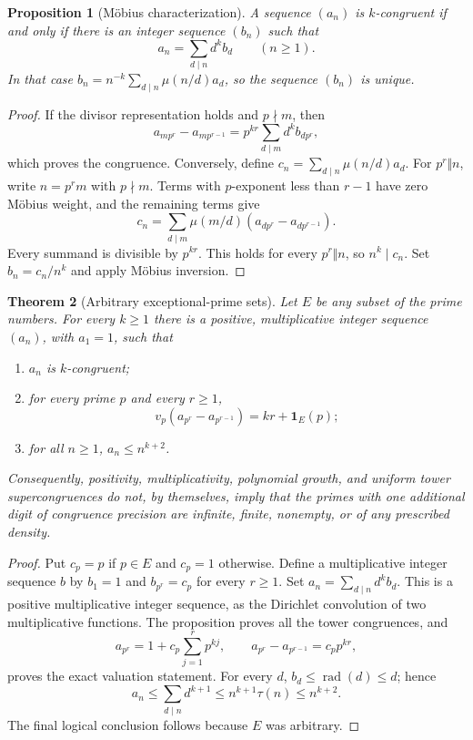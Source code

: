 \documentclass[11pt,a4paper]{article}
\newtheorem{theorem}{Theorem}[section]
\newtheorem{proposition}[theorem]{Proposition}
\theoremstyle{definition}
\theoremstyle{remark}
\begin{document}
\begin{proposition}[M\"obius characterization]
A sequence $(a_n)$ is $k$-congruent if and only if there is an integer
sequence $(b_n)$ such that
\[
 a_n=\sum_{d\mid n}d^k b_d\qquad(n\ge1).
\]
In that case $b_n=n^{-k}\sum_{d\mid n}\mu(n/d)a_d$, so the
sequence $(b_n)$ is unique.
\end{proposition}
\begin{proof}
If the divisor representation holds and $p\nmid m$, then
\[
 a_{mp^r}-a_{mp^{r-1}}
 =p^{kr}\sum_{d\mid m}d^k b_{dp^r},
\]
which proves the congruence. Conversely, define
$c_n=\sum_{d\mid n}\mu(n/d)a_d$. For $p^r\Vert n$, write
$n=p^r m$ with $p\nmid m$. Terms with $p$-exponent less than $r-1$
have zero M\"obius weight, and the remaining terms give
\[
 c_n=\sum_{d\mid m}\mu(m/d)
       (a_{dp^r}-a_{dp^{r-1}}).
\]
Every summand is divisible by $p^{kr}$. This holds for every
$p^r\Vert n$, so $n^k\mid c_n$. Set $b_n=c_n/n^k$ and apply
M\"obius inversion.
\end{proof}

\begin{theorem}[Arbitrary exceptional-prime sets]
Let $E$ be any subset of the prime numbers. For every $k\ge1$ there is
a positive, multiplicative integer sequence $(a_n)$, with $a_1=1$,
such that
\begin{enumerate}
\item $a_n$ is $k$-congruent;
\item for every prime $p$ and every $r\ge1$,
\[
 v_p(a_{p^r}-a_{p^{r-1}})
 =kr+\boldsymbol{1}_{E}(p);
\]
\item for all $n\ge1$, $a_n\le n^{k+2}$.
\end{enumerate}
Consequently, positivity, multiplicativity, polynomial growth, and
uniform tower supercongruences do not, by themselves, imply that the
primes with one additional digit of congruence precision are infinite,
finite, nonempty, or of any prescribed density.
\end{theorem}
\begin{proof}
Put $c_p=p$ if $p\in E$ and $c_p=1$ otherwise. Define a multiplicative
integer sequence $b$ by $b_1=1$ and $b_{p^r}=c_p$ for every $r\ge1$.
Set $a_n=\sum_{d\mid n}d^k b_d$. This is a positive multiplicative
integer sequence, as the Dirichlet convolution of two multiplicative
functions. The proposition proves all the tower congruences, and
\[
 a_{p^r}=1+c_p\sum_{j=1}^r p^{kj},
 \qquad a_{p^r}-a_{p^{r-1}}=c_p p^{kr},
\]
proves the exact valuation statement.
For every $d$, $b_d\le\operatorname{rad}(d)\le d$; hence
\[
 a_n\le\sum_{d\mid n}d^{k+1}
       \le n^{k+1}\tau(n)\le n^{k+2}.
\]
The final logical conclusion follows because $E$ was arbitrary.
\end{proof}
\end{document}
